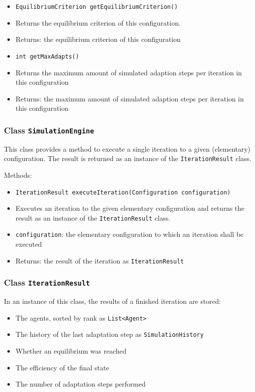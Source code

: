 \documentclass[parskip=full,11pt]{scrartcl}
\begin{document}
\begin{itemize}
\item \texttt{EquilibriumCriterion getEquilibriumCriterion()}
\item[] Returns the equilibrium criterion of this configuration.
\item[] Returns: the equilibrium criterion of this configuration

\item \texttt{int getMaxAdapts()}
\item[] Returns the maximum amount of simulated adaption steps per iteration in this configuration
\item[] Returns: the maximum amount of simulated adaption steps per iteration in this configuration
\end{itemize}

\subsubsection{Class \texttt{SimulationEngine}}
This class provides a method to execute a single iteration to a given (elementary) configuration. The result is returned as an instance of the \texttt{IterationResult} class.

Methods:
\begin{itemize}\itemsep -10pt
\item \texttt{IterationResult executeIteration(Configuration configuration)}
\item[] Executes an iteration to the given elementary configuration and returns the result as an instance of the \texttt{IterationResult} class.
\item[] \texttt{configuration}: the elementary configuration to which an iteration shall be executed
\item[] Returns: the result of the iteration as \texttt{IterationResult}
\end{itemize}

\subsubsection{Class \texttt{IterationResult}}
In an instance of this class, the results of a finished iteration are stored:
\begin{itemize}\itemsep -10pt
\item The agents, sorted by rank as \texttt{List<Agent>}
\item The history of the last adaptation step as \texttt{SimulationHistory}
\item Whether an equilibrium was reached
\item The efficiency of the final state
\item The number of adaptation steps performed
\end{itemize}
\end{document}
